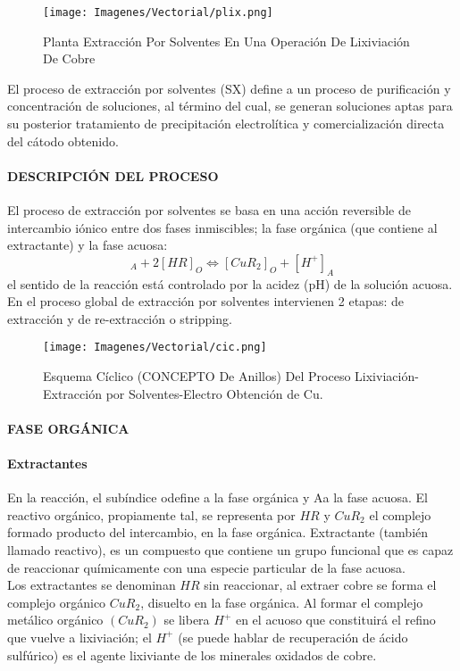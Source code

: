 \begin{figure}[H]
 \centering
 \texttt{[image: Imagenes/Vectorial/plix.png]}
 \caption{Planta Extracci\'on Por Solventes En Una Operaci\'on De Lixiviaci\'on De Cobre}
 \label{fig:plix}
\end{figure}

El proceso de extracci\'on por solventes (SX) define a un proceso de purificaci\'on y concentraci\'on de soluciones, al t\'ermino del cual, se generan soluciones aptas para su posterior tratamiento de precipitaci\'on electrol\'itica y comercializaci\'on directa del c\'atodo obtenido.

\paragraph{DESCRIPCI\'ON DEL PROCESO}
El proceso de extracci\'on por solventes se basa en una acci\'on reversible de intercambio i\'onico entre dos fases inmiscibles; la fase org\'anica (que contiene al extractante) y la fase acuosa: 
\begin{equation}
 [Cu^{++}]_A+2[HR]_O \Leftrightarrow [CuR_2]_O+[H^+]_A
\end{equation}
el sentido de la reacci\'on est\'a controlado por la acidez (pH) de la soluci\'on acuosa. En el proceso global de extracci\'on por solventes intervienen 2 etapas: de extracci\'on y de re-extracci\'on o stripping.
\begin{figure}[H]
 \centering
 \texttt{[image: Imagenes/Vectorial/cic.png]}
 \caption{Esquema C\'iclico (CONCEPTO De Anillos) Del Proceso Lixiviaci\'on-Extracci\'on por Solventes-Electro Obtenci\'on de Cu.}
 \label{fig:cic}
\end{figure}

\paragraph{FASE ORG\'ANICA}

\paragraph{Extractantes}
En la reacci\'on, el subíndice \textacutedbl o\textgravedbl define a la fase org\'anica y \textacutedbl A\textgravedbl a la fase acuosa. El reactivo org\'anico, propiamente tal, se representa por $HR$ y $CuR_2$ el complejo formado producto del intercambio, en la fase org\'anica. Extractante (tambi\'en llamado reactivo), es un compuesto que contiene un grupo funcional que es capaz de reaccionar qu\'imicamente con una especie particular de la fase acuosa. \\
Los extractantes se denominan $HR$ sin reaccionar, al extraer cobre se forma el complejo org\'anico $CuR_2$, disuelto en la fase org\'anica. Al formar el complejo met\'alico org\'anico $(CuR_2)$ se libera $H^+$ en el acuoso que constituir\'a el refino que vuelve a lixiviaci\'on; el $H^+$ (se puede hablar de recuperaci\'on de \'acido sulf\'urico) es el agente lixiviante de los minerales oxidados de cobre.\\ 

